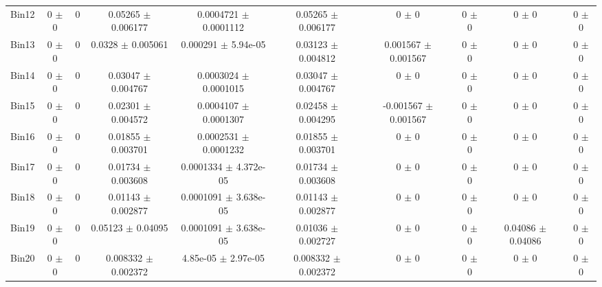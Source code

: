\begin{tabular}{@{\extracolsep{4pt}}lccccccccc@{}}
     Bin12 & 0 $\pm$ 0 & 0 & 0.05265 $\pm$ 0.006177 & 0.0004721 $\pm$ 0.0001112 & 0.05265 $\pm$ 0.006177 & 0 $\pm$ 0 & 0 $\pm$ 0 & 0 $\pm$ 0 & 0 $\pm$ 0 \\ 
     Bin13 & 0 $\pm$ 0 & 0 & 0.0328 $\pm$ 0.005061 & 0.000291 $\pm$ 5.94e-05 & 0.03123 $\pm$ 0.004812 & 0.001567 $\pm$ 0.001567 & 0 $\pm$ 0 & 0 $\pm$ 0 & 0 $\pm$ 0 \\ 
     Bin14 & 0 $\pm$ 0 & 0 & 0.03047 $\pm$ 0.004767 & 0.0003024 $\pm$ 0.0001015 & 0.03047 $\pm$ 0.004767 & 0 $\pm$ 0 & 0 $\pm$ 0 & 0 $\pm$ 0 & 0 $\pm$ 0 \\ 
     Bin15 & 0 $\pm$ 0 & 0 & 0.02301 $\pm$ 0.004572 & 0.0004107 $\pm$ 0.0001307 & 0.02458 $\pm$ 0.004295 & -0.001567 $\pm$ 0.001567 & 0 $\pm$ 0 & 0 $\pm$ 0 & 0 $\pm$ 0 \\ 
     Bin16 & 0 $\pm$ 0 & 0 & 0.01855 $\pm$ 0.003701 & 0.0002531 $\pm$ 0.0001232 & 0.01855 $\pm$ 0.003701 & 0 $\pm$ 0 & 0 $\pm$ 0 & 0 $\pm$ 0 & 0 $\pm$ 0 \\ 
     Bin17 & 0 $\pm$ 0 & 0 & 0.01734 $\pm$ 0.003608 & 0.0001334 $\pm$ 4.372e-05 & 0.01734 $\pm$ 0.003608 & 0 $\pm$ 0 & 0 $\pm$ 0 & 0 $\pm$ 0 & 0 $\pm$ 0 \\ 
     Bin18 & 0 $\pm$ 0 & 0 & 0.01143 $\pm$ 0.002877 & 0.0001091 $\pm$ 3.638e-05 & 0.01143 $\pm$ 0.002877 & 0 $\pm$ 0 & 0 $\pm$ 0 & 0 $\pm$ 0 & 0 $\pm$ 0 \\ 
     Bin19 & 0 $\pm$ 0 & 0 & 0.05123 $\pm$ 0.04095 & 0.0001091 $\pm$ 3.638e-05 & 0.01036 $\pm$ 0.002727 & 0 $\pm$ 0 & 0 $\pm$ 0 & 0.04086 $\pm$ 0.04086 & 0 $\pm$ 0 \\ 
     Bin20 & 0 $\pm$ 0 & 0 & 0.008332 $\pm$ 0.002372 & 4.85e-05 $\pm$ 2.97e-05 & 0.008332 $\pm$ 0.002372 & 0 $\pm$ 0 & 0 $\pm$ 0 & 0 $\pm$ 0 & 0 $\pm$ 0 \\ 
\hline\hline
  \end{tabular}
